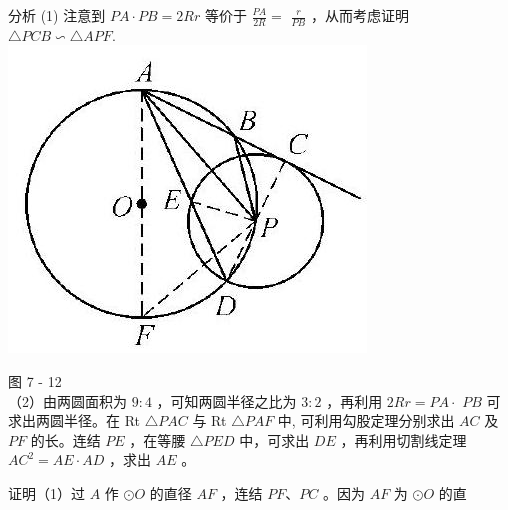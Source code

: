 \documentclass[10pt]{article}
\begin{document}
分析 (1) 注意到 $P A \cdot P B=2 R r$ 等价于 $\frac{P A}{2 R}=$ $\frac{r}{P B}$ ，从而考虑证明 $\triangle P C B \backsim \triangle A P F$.\\
\includegraphics[max width=\textwidth, center]{2024_10_30_66b8e5e701da2093c133g-055(1)}

图 7 - 12\\
（2）由两圆面积为 $9: 4$ ，可知两圆半径之比为 $3: 2$ ，再利用 $2 R r=P A \cdot$ $P B$ 可求出两圆半径。在 Rt $\triangle P A C$ 与 Rt $\triangle P A F$ 中, 可利用勾股定理分别求出 $A C$ 及 $P F$ 的长。连结 $P E$ ，在等腰 $\triangle P E D$ 中，可求出 $D E$ ，再利用切割线定理 $A C^{2}=A E \cdot A D$ ，求出 $A E$ 。

证明（1）过 $A$ 作 $\odot O$ 的直径 $A F$ ，连结 $P F 、 P C$ 。因为 $A F$ 为 $\odot O$ 的直
\end{document}
